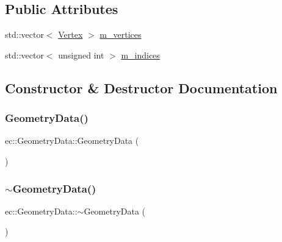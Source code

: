 \subsection*{Public Attributes}
\begin{DoxyCompactItemize}
\item 
std\+::vector$<$ \mbox{\hyperlink{structec_1_1_vertex}{Vertex}} $>$ \mbox{\hyperlink{classec_1_1_geometry_data_ade3f4dd48315b696846bb2c00267394c}{m\+\_\+vertices}}
\item 
std\+::vector$<$ unsigned int $>$ \mbox{\hyperlink{classec_1_1_geometry_data_ab32858fa60eb5c6859c287d00b14357d}{m\+\_\+indices}}
\end{DoxyCompactItemize}


\subsection{Constructor \& Destructor Documentation}
\mbox{\label{classec_1_1_geometry_data_a21db28a4c6d964c8bc59cc698170e77c}} 
\subsubsection{\texorpdfstring{Geometry\+Data()}{GeometryData()}}
{\footnotesize\ttfamily ec\+::\+Geometry\+Data\+::\+Geometry\+Data (\begin{DoxyParamCaption}{ }\end{DoxyParamCaption})}

\mbox{\label{classec_1_1_geometry_data_ab0684d232286015d10fb40ab49836c84}} 
\subsubsection{\texorpdfstring{$\sim$\+Geometry\+Data()}{~GeometryData()}}
{\footnotesize\ttfamily ec\+::\+Geometry\+Data\+::$\sim$\+Geometry\+Data (\begin{DoxyParamCaption}{ }\end{DoxyParamCaption})}



